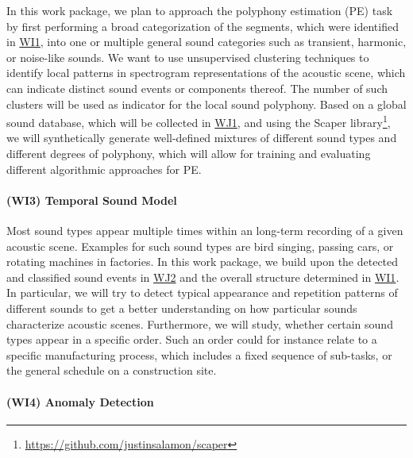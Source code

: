 \documentclass[11pt]{article}
\newcommand{\wpdef}[2]{\hypertarget{sec:W#1}{\paragraph*{(W#1) #2}\label{sec:W#1}}}
\newcommand{\wpref}[2]{\hyperlink{sec:W#1}{#2}}
\begin{document}
In this work package, we plan to approach the polyphony estimation (PE) task by first performing a broad categorization of the segments, which were identified in \wpref{I1}{WI1}, into one or multiple general sound categories such as transient, harmonic, or noise-like sounds.
We want to use unsupervised clustering techniques to identify local patterns in spectrogram representations of the acoustic scene, which can indicate distinct sound events or components thereof. The number of such clusters will be used as indicator for the local sound polyphony.
Based on a global sound database, which will be collected in \wpref{J1}{WJ1}, and using the Scaper library\footnote{\url{https://github.com/justinsalamon/scaper}}, we will synthetically generate well-defined mixtures of different sound types and different degrees of polyphony, which will allow for training and evaluating different algorithmic approaches for PE.


\wpdef{I3}{Temporal Sound Model}

Most sound types appear multiple times within an long-term recording of a given acoustic scene. Examples for such sound types are bird singing, passing cars, or rotating machines in factories.
In this work package, we build upon the detected and classified sound events in \wpref{J2}{WJ2} and the overall structure determined in \wpref{I1}{WI1}.
In particular, we will try to detect typical appearance and repetition patterns of different sounds to get a better understanding on how particular sounds characterize acoustic scenes. Furthermore, we will study, whether certain sound types appear in a specific order. Such an order could for instance relate to a specific manufacturing process, which includes a fixed sequence of sub-tasks, or the general schedule on a construction site.

\wpdef{I4}{Anomaly Detection}
\end{document}
